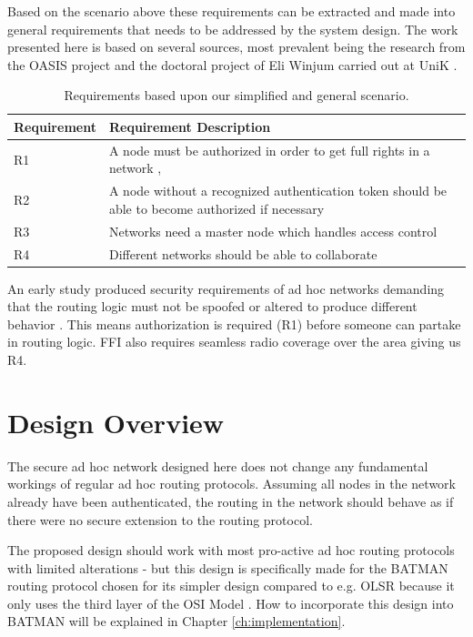 Based on the scenario above these requirements can be extracted and made into
general requirements that needs to be addressed by the system design. The work
presented here is based on several sources, most prevalent being the research
from the OASIS project \cite{oasis_report} \cite{5683058} \cite{nyre2009secure}
and the doctoral project of Eli Winjum carried out at UniK
\cite{ffi_2005_04015}.

\begin{table}[ht!]
	\centering
	\begin{tabular}{ | l | p{11cm} | }
	\hline
	\textbf{Requirement} & \textbf{Requirement Description}\\\hline
		R1 & A node must be authorized in order to get full rights in a
		network \cite{dahill2001secure}, \cite{sanzgiri2002secure}\\\hline
		R2 & A node without a recognized authentication token should be able to become
		authorized if necessary\\ \hline
		R3 & Networks need a master node which handles access control\\\hline
		R4 & Different networks should be able to collaborate
		\cite{ffi_2005_04015}\\\hline
	\end{tabular}
	\caption{Requirements based upon our simplified and general scenario.}
	\label{tab:our_req}
\end{table}

An early study produced security requirements of ad hoc networks demanding
that the routing logic must not be spoofed or altered to produce different
behavior \cite{dahill2001secure}. This means authorization is required (R1)
before someone can partake in routing logic. FFI also requires seamless radio coverage over the
area giving us R4.

\section{Design Overview}
The secure ad hoc network designed here does not change any fundamental workings
of regular ad hoc routing protocols. Assuming all nodes in the network already
have been authenticated, the routing in the network should behave as if there
were no secure extension to the routing protocol.

The proposed design should work with most pro-active ad hoc routing protocols
with limited alterations - but this design is specifically made for the
BATMAN \cite{batman_rfc} routing protocol chosen for its simpler design compared to
e.g. OLSR \cite{clausen2003rfc3626} because it only uses the third layer of the
\ac{OSI} Model \cite{zimmermann1980osi}. How to incorporate this design into
BATMAN will be explained in Chapter \ref{ch:implementation}.

